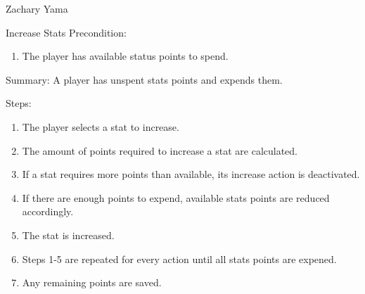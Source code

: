 \documentclass[12pt]{report}
\begin{document}
\begin{section}{Zachary Yama}
\begin{subsection}{Increase Stats}
Precondition:
\begin{enumerate}
\item The player has available status points to spend.
\end{enumerate}

Summary: A player has unspent stats points and expends them. 

Steps:
\begin{enumerate}
\item The player selects a stat to increase.
\item The amount of points required to increase a stat are calculated.
\item If a stat requires more points than available, its increase action is
deactivated.
\item If there are enough points to expend, available stats points are
reduced accordingly.
\item The stat is increased. 
\item Steps 1-5 are repeated for every action until all stats points are
expened.
\item Any remaining points are saved.
\end{enumerate}
\end{subsection}
\end{section}
\end{document}
